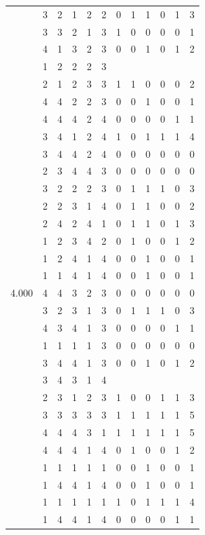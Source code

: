 \documentclass[]{msu-thesis}
\theoremstyle{definition}
\theoremstyle{definition}
\theoremstyle{definition}
\theoremstyle{remark}
\begin{document}
\begin{table}
{\begin{tabular}[t]{rrrrrrrrrrrr}
 & 3 & 2 & 1 & 2 & 2 & 0 & 1 & 1 & 0 & 1 & 3\\
 & 3 & 3 & 2 & 1 & 3 & 1 & 0 & 0 & 0 & 0 & 1\\
 & 4 & 1 & 3 & 2 & 3 & 0 & 0 & 1 & 0 & 1 & 2\\
 & 1 & 2 & 2 & 2 & 3 &  &  &  &  &  & \\
 & 2 & 1 & 2 & 3 & 3 & 1 & 1 & 0 & 0 & 0 & 2\\
 & 4 & 4 & 2 & 2 & 3 & 0 & 0 & 1 & 0 & 0 & 1\\
 & 4 & 4 & 4 & 2 & 4 & 0 & 0 & 0 & 0 & 1 & 1\\
 & 3 & 4 & 1 & 2 & 4 & 1 & 0 & 1 & 1 & 1 & 4\\
 & 3 & 4 & 4 & 2 & 4 & 0 & 0 & 0 & 0 & 0 & 0\\
 & 2 & 3 & 4 & 4 & 3 & 0 & 0 & 0 & 0 & 0 & 0\\
 & 3 & 2 & 2 & 2 & 3 & 0 & 1 & 1 & 1 & 0 & 3\\
 & 2 & 2 & 3 & 1 & 4 & 0 & 1 & 1 & 0 & 0 & 2\\
 & 2 & 4 & 2 & 4 & 1 & 0 & 1 & 1 & 0 & 1 & 3\\
 & 1 & 2 & 3 & 4 & 2 & 0 & 1 & 0 & 0 & 1 & 2\\
 & 1 & 2 & 4 & 1 & 4 & 0 & 0 & 1 & 0 & 0 & 1\\
 & 1 & 1 & 4 & 1 & 4 & 0 & 0 & 1 & 0 & 0 & 1\\
4.000 & 4 & 4 & 3 & 2 & 3 & 0 & 0 & 0 & 0 & 0 & 0\\
 & 3 & 2 & 3 & 1 & 3 & 0 & 1 & 1 & 1 & 0 & 3\\
 & 4 & 3 & 4 & 1 & 3 & 0 & 0 & 0 & 0 & 1 & 1\\
 & 1 & 1 & 1 & 1 & 3 & 0 & 0 & 0 & 0 & 0 & 0\\
 & 3 & 4 & 4 & 1 & 3 & 0 & 0 & 1 & 0 & 1 & 2\\
 & 3 & 4 & 3 & 1 & 4 &  &  &  &  &  & \\
 & 2 & 3 & 1 & 2 & 3 & 1 & 0 & 0 & 1 & 1 & 3\\
 & 3 & 3 & 3 & 3 & 3 & 1 & 1 & 1 & 1 & 1 & 5\\
 & 4 & 4 & 4 & 3 & 1 & 1 & 1 & 1 & 1 & 1 & 5\\
 & 4 & 4 & 4 & 1 & 4 & 0 & 1 & 0 & 0 & 1 & 2\\
 & 1 & 1 & 1 & 1 & 1 & 0 & 0 & 1 & 0 & 0 & 1\\
 & 1 & 4 & 4 & 1 & 4 & 0 & 0 & 1 & 0 & 0 & 1\\
 & 1 & 1 & 1 & 1 & 1 & 1 & 0 & 1 & 1 & 1 & 4\\
 & 1 & 4 & 4 & 1 & 4 & 0 & 0 & 0 & 0 & 1 & 1\\

\end{tabular}}
\end{table}
\end{document}
